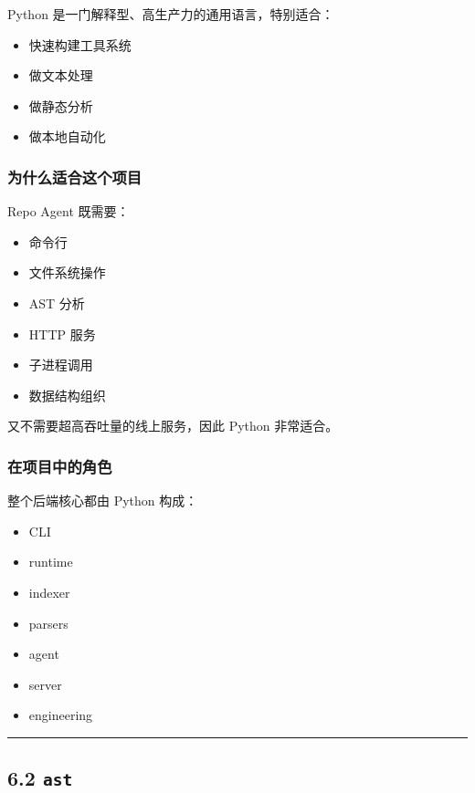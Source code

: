 \documentclass[UTF8,12pt,openany]{ctexbook}
\begin{document}
Python 是一门解释型、高生产力的通用语言，特别适合：\par

\begin{itemize}
\item 快速构建工具系统
\item 做文本处理
\item 做静态分析
\item 做本地自动化
\end{itemize}

\subsubsection{为什么适合这个项目}

Repo Agent 既需要：\par

\begin{itemize}
\item 命令行
\item 文件系统操作
\item AST 分析
\item HTTP 服务
\item 子进程调用
\item 数据结构组织
\end{itemize}

又不需要超高吞吐量的线上服务，因此 Python 非常适合。\par

\subsubsection{在项目中的角色}

整个后端核心都由 Python 构成：\par

\begin{itemize}
\item CLI
\item runtime
\item indexer
\item parsers
\item agent
\item server
\item engineering
\end{itemize}

\hrule

\subsection{6.2 \texttt{ast}}
\end{document}
